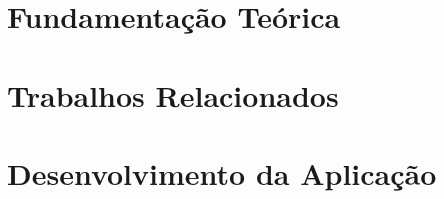 \documentclass[a4paper,12pt,oneside,openany]{book}
\begin{document}
\frontmatter
\thispagestyle{empty}



\pagebreak


     \tableofcontents
\listoffigures
\listoftables

\mainmatter
\cleardoublepage

\chapter{Fundamentação Teórica}
\label{ch:cap2}

\chapter{Trabalhos Relacionados}
\label{ch:cap3}

\chapter{Desenvolvimento da Aplicação}
\label{ch:cap4}
\end{document}
